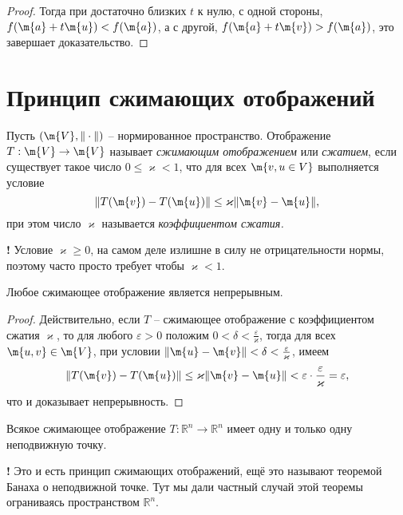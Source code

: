 \begin{proof}
Тогда при достаточно близких $t$ к нулю, с одной стороны, $f(\m{a} + t \m{u}) < f(\m{a})$, а с другой, $f(\m{a} + t \m{v}) > f(\m{a})$, это завершает доказательство. 
\end{proof}

\section{Принцип сжимающих отображений}


\begin{definition}
    Пусть $(\m{V}, \| \cdot \|)$ -- нормированное пространство. Отображение $T: \m{V} \to \m{V}$ называет \textit{сжимающим отображением} или \textit{сжатием}, если существует такое число $0 \le \varkappa <1$, что для всех $\m{v,u \in V}$ выполняется условие
    \[
     \| T(\m{v}) - T(\m{u}) \| \le \varkappa \| \m{v} - \m{u}\|,
    \]
    при этом число $\varkappa$ называется \textit{коэффициентом сжатия.}
\end{definition}



\begin{mydanger}{\bf !}
   Условие $\varkappa \ge 0$, на самом деле излишне в силу не отрицательности нормы, поэтому часто просто требует чтобы $\varkappa <1.$
\end{mydanger}


\begin{lemma}
    Любое сжимающее отображение является непрерывным.
\end{lemma}

\begin{proof}
    Действительно, если $T$ -- сжимающее отображение с коэффициентом сжатия $\varkappa$, то для любого $\varepsilon>0$ положим $0 <\delta < \frac{\varepsilon}{\varkappa}$, тогда для всех $\m{u,v} \in \m{V}$, при условии $\|\m{u} - \m{v}\|< \delta < \frac{\varepsilon}{\varkappa}$, имеем
    \[
     \| T(\m{v}) - T(\m{u}) \| \le \varkappa \| \m{v} - \m{u}\| < \varepsilon \cdot \frac{\varepsilon}{\varkappa} = \varepsilon,
    \]
    что и доказывает непрерывность.
\end{proof}

\begin{theorem}[Бaнах]
    Всякое сжимающее отображение $T:\mathbb{R}^n \to \mathbb{R}^n$ имеет одну и только одну неподвижную точку.
\end{theorem}

\begin{mydangerr}{\bf!}
    Это и есть принцип сжимающих отображений, ещё это называют теоремой Банаха о неподвижной точке. Тут мы дали частный случай этой теоремы ограниваясь пространством $\mathbb{R}^n$.
\end{mydangerr}



